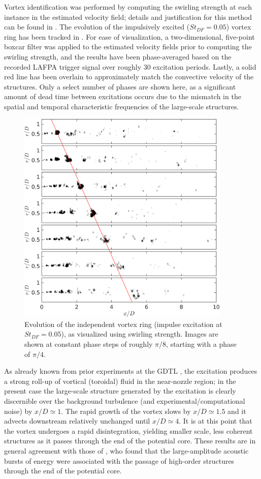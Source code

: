 Vortex identification was performed by computing the swirling strength at each instance in the estimated velocity field; details and justification for this method can be found in \citet{Adrian2000}.
The evolution of the impulsively excited ($St_{DF} = 0.05$) vortex ring has been tracked in .
For ease of visualization, a two-dimensional, five-point boxcar filter was applied to the estimated velocity fields prior to computing the swirling strength, and the results have been phase-averaged based on the recorded LAFPA trigger signal over roughly 30 excitation periods.
Lastly, a solid red line has been overlain to approximately match the convective velocity of the structures.
Only a select number of phases are shown here, as a significant amount of dead time between excitations occurs due to the mismatch in the spatial and temporal characteristic frequencies of the large-scale structures.
\begin{figure}
	\centering
	\includegraphics[width=4in]{Figures/ch4_St005_lambda.png}
	\caption{Evolution of the independent vortex ring (impulse excitation at $St_{DF}=0.05$), as visualized using swirling strength. Images are shown at constant phase steps of roughly $\pi/8$, starting with a phase of $\pi/4$.}
	\label{fig:ch4_impulse_structure_disintegration}
\end{figure}

As already known from prior experiments at the GDTL \citep{Kearney-Fischer2009}, the excitation produces a strong roll-up of vortical (toroidal) fluid in the near-nozzle region; in the present case the large-scale structure generated by the excitation is clearly discernible over the background turbulence (and experimental/computational noise) by $x/D \simeq 1$.
The rapid growth of the vortex slows by $x/D \simeq 1.5$ and it advects downstream relatively unchanged until  $x/D \simeq 4$.
It is at this point that the vortex undergoes a rapid disintegration, yielding smaller scale, less coherent structures as it passes through the end of the potential core.
These results are in general agreement with those of \citet{Hileman2005}, who found that the large-amplitude acoustic bursts of energy were associated with the passage of high-order structures through the end of the potential core.

